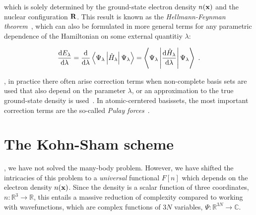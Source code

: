which is solely determined by the ground-state electron density $n ({\bf x})$ and the nuclear configuration $\bf R$. This result is known as the \emph{Hellmann-Feynman theorem}~\cite{Hellmann2015,Feynman.1939}, which can also be formulated in more general terms for any parametric dependence of the Hamiltonian on some external quantitiy $\lambda$:
\begin{theorem}
\begin{align}
	\frac{{\rm d} E_{\lambda}}{{\rm d} \lambda}
		= \frac{{\rm d}}{{\rm d} \lambda}\left\langle\Psi_{\lambda} \left|\hat{H}_{\lambda}\right| \Psi_{\lambda} \right\rangle
		= \left\langle\Psi_{\lambda} \left| \frac{{\rm d} \hat{H}_{\lambda}}{{\rm d} \lambda} \right| \Psi_{\lambda} \right\rangle~.
\end{align}
\end{theorem}

, in practice there often arise correction terms when non-complete basis sets are used that also depend on the parameter $\lambda$, or an approximation to the true ground-state density is used~\cite{Bendt.1983,Scheffler.1984,Chan.1993,Ventra.2000}. In atomic-cerntered basissets, the most important correction terms are the so-called \emph{Pulay forces}~\cite{Pulay.1969}.

\newpage

\section{The Kohn-Sham scheme}
, we have not solved the many-body problem. However, we have shifted the intricacies of this problem to a \emph{universal} functional $F[n]$ which depends on the electron density $n({\bf x})$. Since the density is a scalar function of three coordinates, $n: \mathds R^3 \rightarrow \mathds R$, this entails a massive reduction of complexity compared to working with wavefunctions, which are complex functions of $3N$ variables, $\Psi: \mathds R^{3N} \rightarrow \mathds C$.

